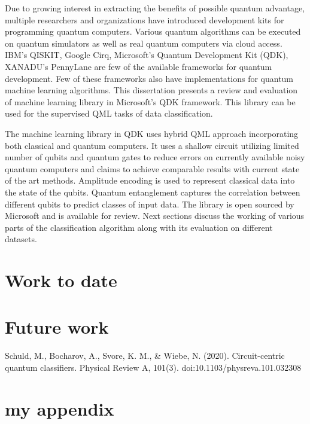 \documentclass[english,a4paper,11pt,oneside,onecolumn]{book}
\begin{document}
Due to growing interest in extracting the benefits of possible quantum advantage, multiple researchers and organizations have introduced development kits for programming quantum computers. Various quantum algorithms can be executed on quantum simulators as well as real quantum computers via cloud access. IBM's QISKIT, Google Cirq, Microsoft's Quantum Development Kit (QDK), XANADU's PennyLane are few of the available frameworks for quantum development. Few of these frameworks also have implementations for quantum machine learning algorithms. This dissertation presents a review and evaluation of machine learning library in Microsoft's QDK framework. This library can be used for the supervised QML tasks of data classification.\par
The machine learning library in QDK uses hybrid QML approach incorporating both classical and quantum computers. It uses a shallow circuit utilizing limited number of qubits and quantum gates to reduce errors on currently available noisy quantum computers and claims to achieve comparable results with current state of the art methods. Amplitude encoding is used to represent classical data into the state of the qubits. Quantum entanglement captures the correlation between different qubits to predict classes of input data. The library is open sourced by Microsoft and is available for review. Next sections discuss the working of various parts of the classification algorithm along with its evaluation on different datasets.\par 

\chapter{Work to date}
\label{sec:wtd}


\chapter{Future work}
\label{sec:fw}


\nocite{}



 
Schuld, M., Bocharov, A., Svore, K. M., & Wiebe, N. (2020). Circuit-centric quantum classifiers. Physical Review A, 101(3). doi:10.1103/physreva.101.032308

\appendix
\chapter{my appendix}
\end{document}
